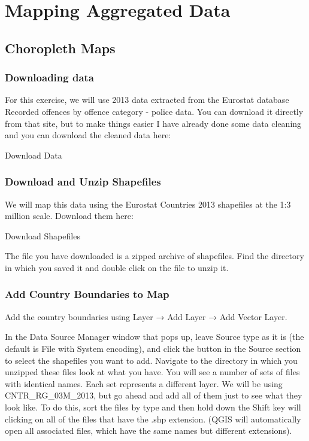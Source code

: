 \documentclass[]{book}
\begin{document}
\hypertarget{aggregated-data}{%
\chapter{Mapping Aggregated Data}\label{aggregated-data}}

\hypertarget{choropleth-maps}{%
\section{Choropleth Maps}\label{choropleth-maps}}

\hypertarget{downloading-data-1}{%
\subsection{Downloading data}\label{downloading-data-1}}

For this exercise, we will use 2013 data extracted from the Eurostat database Recorded offences by offence category - police data. You can download it directly from that site, but to make things easier I have already done some data cleaning and you can download the cleaned data here:

Download Data

\hypertarget{download-and-unzip-shapefiles}{%
\subsection{Download and Unzip Shapefiles}\label{download-and-unzip-shapefiles}}

We will map this data using the Eurostat Countries 2013 shapefiles at the 1:3 million scale. Download them here:

Download Shapefiles

The file you have downloaded is a zipped archive of shapefiles. Find the directory in which you saved it and double click on the file to unzip it.

\hypertarget{add-country-boundaries-to-map}{%
\subsection{Add Country Boundaries to Map}\label{add-country-boundaries-to-map}}

Add the country boundaries using Layer → Add Layer → Add Vector Layer.

In the Data Source Manager window that pops up, leave Source type as it is (the default is File with System encoding), and click the button in the Source section to select the shapefiles you want to add. Navigate to the directory in which you unzipped these files look at what you have. You will see a number of sets of files with identical names. Each set represents a different layer. We will be using CNTR\_RG\_03M\_2013, but go ahead and add all of them just to see what they look like. To do this, sort the files by type and then hold down the Shift key will clicking on all of the files that have the .shp extension. (QGIS will automatically open all associated files, which have the same names but different extensions).
\end{document}
